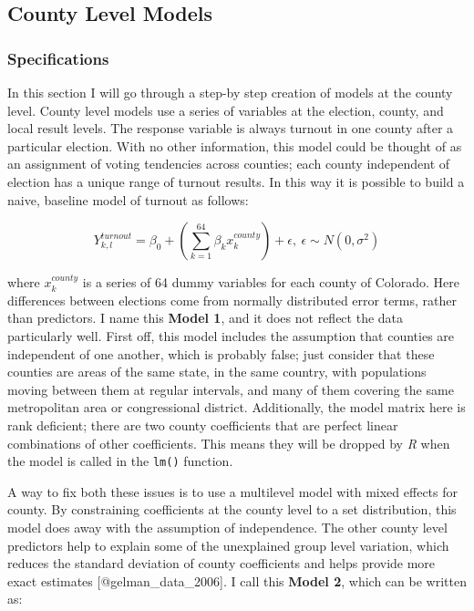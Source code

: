 \documentclass[]{article}
\begin{document}
\subsection{County Level Models}\label{county-level-models}

\subsubsection{Specifications}\label{specifications}

In this section I will go through a step-by step creation of models at
the county level. County level models use a series of variables at the
election, county, and local result levels. The response variable is
always turnout in one county after a particular election. With no other
information, this model could be thought of as an assignment of voting
tendencies across counties; each county independent of election has a
unique range of turnout results. In this way it is possible to build a
naive, baseline model of turnout as follows:

\begin{equation} \tag{Model 1}
Y^{turnout}_{k,l} = \beta_0 + (\sum_{k=1}^{64}\beta_kx_k^{county}) + \epsilon,\ \epsilon \sim N(0,\sigma^2)
\end{equation}

where \(x_k^{county}\) is a series of 64 dummy variables for each county
of Colorado. Here differences between elections come from normally
distributed error terms, rather than predictors. I name this
\textbf{Model 1}, and it does not reflect the data particularly well.
First off, this model includes the assumption that counties are
independent of one another, which is probably false; just consider that
these counties are areas of the same state, in the same country, with
populations moving between them at regular intervals, and many of them
covering the same metropolitan area or congressional district.
Additionally, the model matrix here is rank deficient; there are two
county coefficients that are perfect linear combinations of other
coefficients. This means they will be dropped by \textit{R} when the
model is called in the \texttt{lm()} function.

A way to fix both these issues is to use a multilevel model with mixed
effects for county. By constraining coefficients at the county level to
a set distribution, this model does away with the assumption of
independence. The other county level predictors help to explain some of
the unexplained group level variation, which reduces the standard
deviation of county coefficients and helps provide more exact estimates
{[}@gelman\_data\_2006{]}. I call this \textbf{Model 2}, which can be
written as:
\end{document}

